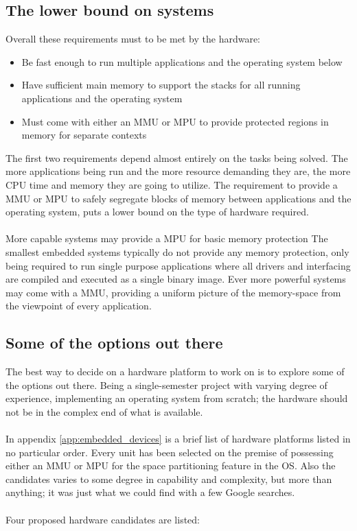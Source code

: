 \subsection{The lower bound on systems}
Overall these requirements must to be met by the hardware:
\begin{itemize}
	\item Be fast enough to run multiple applications and the operating system below
	\item Have sufficient main memory to support the stacks for all running applications and the operating system
	\item Must come with either an MMU or MPU to provide protected regions in memory for separate contexts
\end{itemize}
\noindent
The first two requirements depend almost entirely on the tasks being solved.
The more applications being run and the more resource demanding they are,
the more CPU time and memory they are going to utilize.
The requirement to provide a MMU or MPU to safely segregate blocks of memory between applications and the operating system,
puts a lower bound on the type of hardware required.
\\\\
More capable systems may provide a MPU for basic memory protection
The smallest embedded systems typically do not provide any memory protection,
only being required to run single purpose applications where all drivers and interfacing
are compiled and executed as a single binary image.
Ever more powerful systems may come with a MMU,
providing a uniform picture of the memory-space from the viewpoint of every application.

\subsection{Some of the options out there}
The best way to decide on a hardware platform to work on is to explore some of the options out there.
Being a single-semester project with varying degree of experience,
implementing an operating system from scratch;
the hardware should not be in the complex end of what is available.
\\\\
In appendix \ref{app:embedded_devices} is a brief list of hardware platforms listed in no particular order.
Every unit has been selected on the premise of possessing either an MMU or MPU for the space partitioning feature in the OS.
Also the candidates varies to some degree in capability and complexity,
but more than anything; it was just what we could find with a few Google searches.
\\\\
Four proposed hardware candidates are listed:

